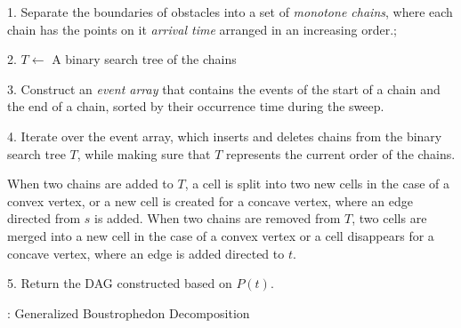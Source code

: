 \begin{algorithm}[h!]
\vspace{1mm}
\DontPrintSemicolon
{}

1. Separate the boundaries of obstacles into a set of \emph{monotone chains},
where each chain has the points on it \emph{arrival time} arranged in an 
increasing order.;\;
\vspace{0.5mm}

2. $T\gets$ A binary search  tree of the chains\;
\vspace{0.5mm}

3. Construct an \emph{event array} that contains the events of the start of a chain and the end of a chain, sorted by their occurrence time during the sweep.\;
\vspace{0.5mm}

4. Iterate over the event array, which inserts and deletes chains from the binary search tree $T$, while making sure that $T$ represents the current order of the chains.\;
\vspace{0.5mm}

When two chains are added to $T$, a cell is split into two new cells in the case of a convex vertex, or a new cell is created for a concave vertex, where an edge directed from $s$ is added.\;
When two chains are removed from $T$, two cells are merged into a new cell in the case of a convex vertex or a cell disappears for a concave vertex, where an edge is added directed to $t$.\;

5. Return the DAG constructed based on $P(t)$.
\caption{\protect{}: Generalized Boustrophedon Decomposition} 
\label{alg:genbou}
\end{algorithm}

